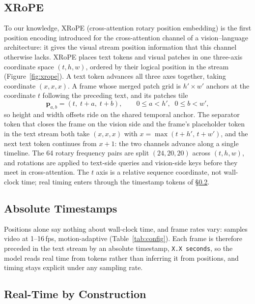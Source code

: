 \subsection{XRoPE}\label{sec:xrope}

To our knowledge, XRoPE (cross-attention rotary position embedding) is
the first position encoding introduced for the cross-attention channel
of a vision--language architecture: it gives the visual stream position
information that this channel otherwise lacks. XRoPE places text tokens
and visual patches in one three-axis coordinate space $(t,h,w)$,
ordered by their logical position in the stream
(Figure~\ref{fig:xrope}). A text token advances all three axes
together, taking coordinate $(x,x,x)$. A frame whose merged patch grid
is $h'\times w'$ anchors at the coordinate $t$ following the preceding
text, and its patches tile
\begin{equation}\label{eq:xrope}
  \mathbf{p}_{a,b} = (t,\; t+a,\; t+b),
  \qquad 0 \le a < h',\;\; 0 \le b < w',
\end{equation}
so height and width offsets ride on the shared temporal anchor. The
separator token that closes the frame on the vision side and the
frame's placeholder token in the text stream both take $(x,x,x)$ with
$x = \max(t+h',\, t+w')$, and the next text token continues from
$x+1$: the two channels advance along a single timeline. The 64 rotary
frequency pairs are split $(24,20,20)$ across $(t,h,w)$, and rotations
are applied to text-side queries and vision-side keys before they meet
in cross-attention. The $t$ axis is a relative sequence coordinate,
not wall-clock time; real timing enters through the timestamp tokens
of \S\ref{sec:timestamps}.

\subsection{Absolute Timestamps}\label{sec:timestamps}

Positions alone say nothing about wall-clock time, and frame rates
vary: \mossvl{} samples video at 1--16\,fps, motion-adaptive
(Table~\ref{tab:config}). Each frame is therefore preceded in the text
stream by an absolute timestamp,
\texttt{X.X seconds}, so
the model reads real time from tokens rather than inferring it from
positions, and timing stays explicit under any sampling rate.

\subsection{Real-Time by Construction}\label{sec:realtime-arch}

